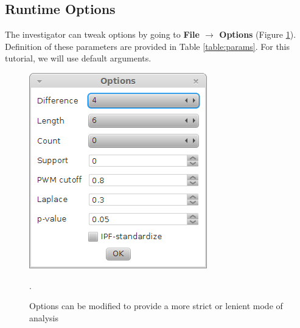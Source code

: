 \documentclass{article}
\begin{document}
\subsection{Runtime Options}
The investigator can tweak options by going to 
\textbf{File $\rightarrow$ Options} (Figure \ref{fig:marinaOptions}). 
Definition of these parameters are provided in Table \ref{table:params}.
For this tutorial, we will use default arguments.

\begin{figure}[htbc]
	\centering
	\includegraphics[scale=0.45]{./images/marina_options.png}
	\caption{Options can be modified to provide a more strict or lenient mode of analysis}.
	\label{fig:marinaOptions}
\end{figure}
\end{document}
